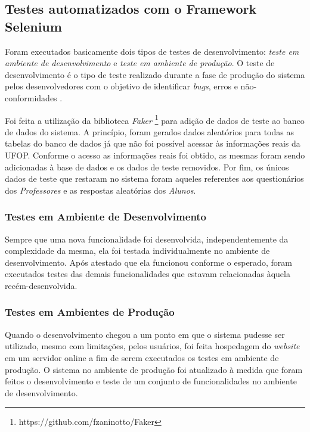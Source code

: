\documentclass[
  12pt,       %
  openright,      %
  oneside,      %
  a4paper,      %
  english,      %
  french,        %
  spanish,     %
  brazil        %
  ]{abntex2-decsi}
\begin{document}
        \subsection{Testes automatizados com o Framework Selenium}

        Foram executados basicamente dois tipos de testes de desenvolvimento: \textit{teste em ambiente de desenvolvimento} e \textit{teste em ambiente de produção}. O teste de desenvolvimento é o tipo de teste realizado durante a fase de produção do sistema pelos desenvolvedores com o objetivo de identificar \textit{bugs}, erros e não-conformidades \cite[p. 210]{sommervile:2011}.

           Foi feita a utilização da biblioteca \textit{Faker} \footnote{https://github.com/fzaninotto/Faker} para adição de dados de teste ao banco de dados do sistema. A princípio, foram gerados dados aleatórios para todas as tabelas do banco de dados já que não foi possível acessar às informações reais da UFOP. Conforme o acesso as informações reais foi obtido, as mesmas foram sendo adicionadas à base de dados e os dados de teste removidos. Por fim, os únicos dados de teste que restaram no sistema foram aqueles referentes aos questionários dos \textit{Professores} e as respostas aleatórias dos \textit{Alunos}. 
       
			\subsubsection{Testes em Ambiente de Desenvolvimento}

			Sempre que uma nova funcionalidade foi desenvolvida, independentemente da complexidade da mesma, ela foi testada individualmente no ambiente de desenvolvimento. Após atestado que ela funcionou conforme o esperado, foram executados testes das demais funcionalidades que estavam relacionadas àquela recém-desenvolvida.
           
			\subsubsection{Testes em Ambientes de Produção}
       
       		Quando o desenvolvimento chegou a um ponto em que o sistema pudesse ser utilizado, mesmo com limitações, pelos usuários, foi feita hospedagem do \textit{website} em um servidor online a fim de serem executados os testes em ambiente de produção. O sistema no ambiente de produção foi atualizado à medida que foram feitos o desenvolvimento e teste de um conjunto de funcionalidades no ambiente de desenvolvimento.
            
\end{document}

